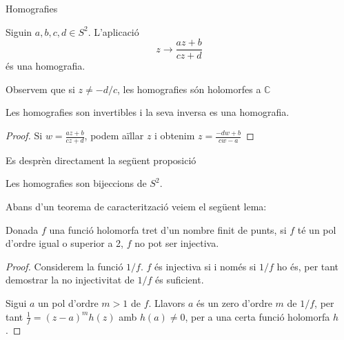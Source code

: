 \documentclass[dvipsnames, svgnames, leqno, a4paper, 12pt]{report}
\begin{document}
    \begin{chapter}{Homografies}
        \begin{definition}[Homografia]
            Siguin \(a,b,c,d\in S^2\). L'aplicació \begin{displaymath}
                z\to\frac{az+b}{cz+d}
            \end{displaymath}
            és una homografia.
        \end{definition}
        Observem que si \begin{math}
            z\neq -d/c
        \end{math}, les homografies són holomorfes a \begin{math}
            \mathbb{C}
        \end{math}
        \begin{proposition}
            Les homografies son invertibles i la seva inversa es una homografia.
        \end{proposition}
        \begin{proof}
            Si \begin{math}
                 w  = \frac{az+b}{cz+d} 
            \end{math}, podem aïllar $z$ i obtenim \begin{math}
                z = \frac{-d  w +b}{c w -a}
            \end{math}
        \end{proof}
        Es desprèn directament la següent proposició
        \begin{proposition}
            Les homografies son bijeccions de $S^2$.
        \end{proposition}
        Abans d'un teorema de caracterització veiem el següent lema:
        \begin{lemma}
            Donada $f$  una funció holomorfa tret d'un nombre finit de punts, si $f$ té un pol d'ordre igual o superior a 2, $f$ no pot ser injectiva.  
        \end{lemma}
        \begin{proof}
            Considerem la funció $1/f$. $f$ és injectiva si i només si $1/f$ ho és, per tant demostrar la no injectivitat de $1/f$ és suficient.
            
            Sigui $a$ un pol d'ordre $m>1$ de $f$. Llavors $a$ és un zero d'ordre $m$ de $1/f$, per tant \begin{math}
                \frac{1}{f}=(z-a)^mh(z)
            \end{math} amb $h(a)\neq0$, per a una certa funció holomorfa $h$.


\end{proof}
\end{chapter}
\end{document}
